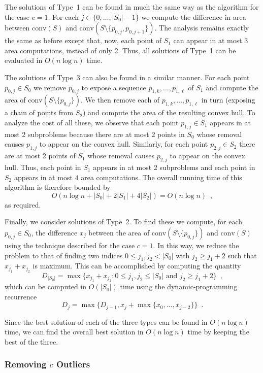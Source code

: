 \documentclass{elsart}
\newcommand{\ch}{\mathrm{conv}}
\begin{document}
The solutions of Type~1 can be found in much the same way as the
algorithm for the case $c=1$.  For each $j\in\{0,\ldots,|S_0|-1\}$ we
compute the difference in area between $\ch(S)$ and
$\ch(S\setminus\{p_{0,j},p_{0,j+1}\})$.  The analysis remains exactly
the same as before except that, now, each point of $S_1$ can appear in
at most $3$ area computations, instead of only 2.  Thus, all solutions
of Type~1 can be evaluated in $O(n\log n)$ time.

The solutions of Type~3 can also be found in a similar manner.  For
each point $p_{0,j}\in S_0$ we remove $p_{0,j}$ to expose a sequence
$p_{1,k},\ldots,p_{1,\ell}$ of $S_1$ and compute the area of
$\ch(S\setminus\{p_{0,j}\})$.  We then remove each of
$p_{1,k},\ldots,p_{1,\ell}$ in turn (exposing a chain of points from
$S_2$) and compute the area of the resulting convex hull.  To analyze
the cost of all these, we observe that each point $p_{1,j}\in S_1$
appears in at most 2 subproblems because there are at most 2 points in
$S_0$ whose removal causes $p_{1,j}$ to appear on the convex hull.
Similarly, for each point $p_{2,j}\in S_2$ there are at most 2 points
of $S_1$ whose removal causes $p_{2,j}$ to appear on the convex hull.
Thus, each point in $S_1$ appears in at most 2 subproblems and each
point in $S_2$ appears in at most $4$ area computations.  The overall
running time of this algorithm is therefore bounded by
\[
    O\left(n\log n + |S_0| + 2|S_1| + 4|S_2|\right) = O(n\log n) \enspace ,
\]
as required.

Finally, we consider solutions of Type~2.  To find these we compute,
for each $p_{0,j}\in S_0$, the difference $x_j$ between the area of
$\ch(S\setminus\{p_{0,j}\})$ and $\ch(S)$ using the technique
described for the case $c=1$.  In this way, we reduce the problem to
that of finding two indices $0\le j_1,j_2< |S_0|$ with $j_2\ge j_1+2$
such that $x_{j_1}+x_{j_2}$ is maximum.  This can be accomplished by
computing the quantity
\[
     D_{|S_0|} = \max\{x_{j_1}+x_{j_2} :
       \mbox{$0\le j_1,j_2\le |S_0|$ and $j_2 \ge j_1+2$}\} \enspace ,
\]
which can be computed in $O(|S_0|)$ time using the dynamic-programming 
recurrence
\[
    D_j = \max\{D_{j-1}, x_{j} + \max\{x_{0},\ldots,x_{j-2}\}\}
                \enspace .
\]

Since the best solution of each of the three types can be found in
$O(n\log n)$ time, we can find the overall best solution in $O(n\log
n)$ time by keeping the best of the three.

\subsubsection{Removing $c$ Outliers}
\end{document}
